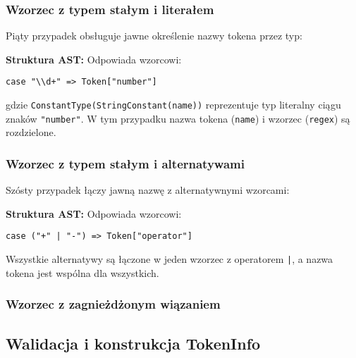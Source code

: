 \subsubsection{Wzorzec z typem stałym i literałem}
\label{subsubsec:cnp-constant-literal}

Piąty przypadek obsługuje jawne określenie nazwy tokena przez typ:



\textbf{Struktura AST:} Odpowiada wzorcowi:
\begin{lstlisting}
case "\\d+" => Token["number"]
\end{lstlisting}

gdzie \texttt{ConstantType(StringConstant(name))} reprezentuje typ literalny ciągu znaków \texttt{"number"}. W tym przypadku nazwa tokena (\texttt{name}) i wzorzec (\texttt{regex}) są rozdzielone.

\subsubsection{Wzorzec z typem stałym i alternatywami}
\label{subsubsec:cnp-constant-alternatives}

Szósty przypadek łączy jawną nazwę z alternatywnymi wzorcami:




\textbf{Struktura AST:} Odpowiada wzorcowi:
\begin{lstlisting}
case ("+" | "-") => Token["operator"]
\end{lstlisting}

Wszystkie alternatywy są łączone w jeden wzorzec z operatorem \texttt{|}, a nazwa tokena jest wspólna dla wszystkich.

\subsubsection{Wzorzec z zagnieżdżonym wiązaniem}
\label{subsubsec:cnp-nested-bind}

\subsection{Walidacja i konstrukcja TokenInfo}
\label{subsec:cnp-validation}

